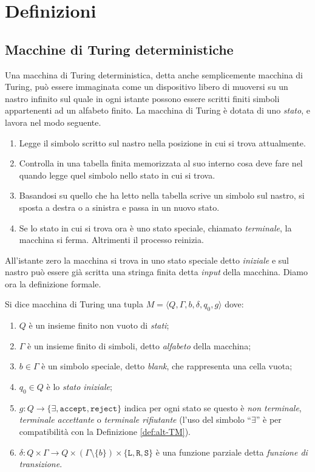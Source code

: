 \chapter{Definizioni}


\section{Macchine di Turing deterministiche}
\label{sec:det-TM}
Una macchina di Turing deterministica, detta anche semplicemente macchina di
Turing, può essere immaginata come un dispositivo libero di
muoversi su un nastro infinito sul quale in ogni istante possono essere scritti
finiti simboli appartenenti ad un alfabeto finito. La macchina di Turing è
dotata di uno \emph{stato}, e lavora nel modo seguente.
\begin{enumerate}
 \item Legge il simbolo scritto sul nastro nella posizione in cui si trova attualmente.
 \item Controlla in una tabella finita memorizzata al suo interno cosa deve fare
 nel quando legge quel simbolo nello stato in cui si trova.
 \item Basandosi su quello che ha letto nella tabella scrive un simbolo sul nastro,
 si sposta a destra o a sinistra e passa in un nuovo stato.
 \item Se lo stato in cui si trova ora è uno stato speciale, chiamato \emph{terminale},
 la macchina si ferma. Altrimenti il processo reinizia.
\end{enumerate}
All'istante zero la macchina si trova in uno stato speciale detto \emph{iniziale}
e sul nastro può essere già scritta una stringa finita detta \emph{input} della macchina.
Diamo ora la definizione formale.
\begin{definizione}
Si dice macchina di Turing una tupla
$M=\langle Q, \Gamma, b, \delta, q_0, g\rangle$ dove:
\begin{enumerate}
 \item $Q$ è un insieme finito non vuoto di \emph{stati};
 \item $\Gamma$ è un insieme finito di simboli, detto \emph{alfabeto} della macchina;
 \item $b \in \Gamma$ è un simbolo speciale, detto \emph{blank}, che rappresenta
 una cella vuota;
 \item $q_0 \in Q$ è lo \emph{stato iniziale};
 \item $g: Q \to \{\exists, \texttt{accept}, \texttt{reject}\}$
  indica per ogni stato se questo è \emph{non terminale}, \emph{terminale accettante} o
  \emph{terminale rifiutante} (l'uso del simbolo ``$\exists$'' è per compatibilità
  con la Definizione \ref{def:alt-TM}).
 \item $\delta: Q \times \Gamma \to Q \times (\Gamma \setminus \{b\}) \times \{\texttt{L},\texttt{R},\texttt{S}\}$
 è una funzione parziale detta \emph{funzione di transizione}.
\end{enumerate}
\end{definizione}

